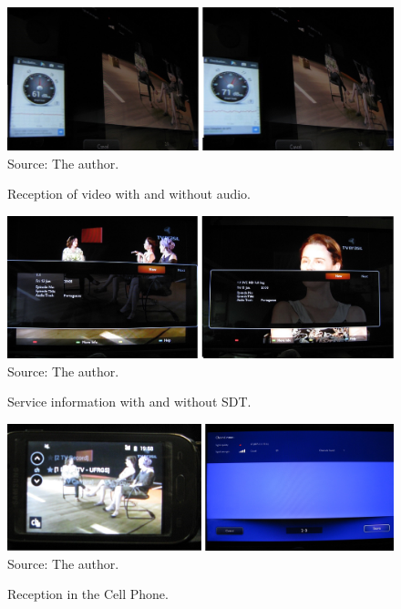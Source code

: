 \documentclass[
	12pt,				%
	openright,			%
	twoside,			%
	a4paper,			%
	brazil,
	french,				%
	english
	]{abntex2}
\begin{document}
\begin{figure}[!h]
\centering
\includegraphics[width=0.9\linewidth]{figuras/video_audio_both.jpg}
\\Source: The author.
\caption{Reception of video with and without audio.}
\label{fig:video_audio_both}
\end{figure}

\begin{figure}[!h]
\centering
\includegraphics[width=0.9\linewidth]{figuras/info_with_without_sdt.jpg}
\\Source: The author.
\caption{Service information with and without SDT.}
\label{fig:info_with_without_sdt}
\end{figure}

\begin{figure}[!h]
\centering
\includegraphics[width=0.45\linewidth]{figuras/cell_with_sdt.jpg}
\\Source: The author.
\caption{Reception in the Cell Phone.}
\label{fig:cell_with_sdt}
\end{figure}

%

\end{document}
